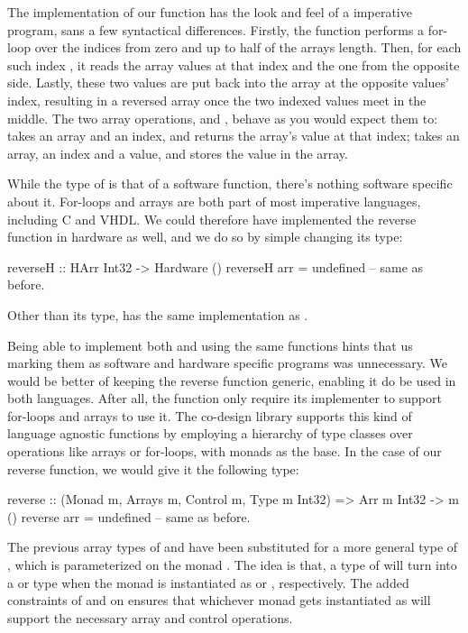 The implementation of our  function has the look and feel of a imperative program, sans a few syntactical differences. Firstly, the function performs a for-loop over the indices from zero and up to half of the arrays length. Then, for each such index , it reads the array values at that index and the one from the opposite side. Lastly, these two values are put back into the array at the opposite values' index, resulting in a reversed array once the two indexed values meet in the middle. The two array operations,  and , behave as you would expect them to:  takes an array and an index, and returns the array's value at that index;  takes an array, an index and a value, and stores the value in the array.

While the type of  is that of a software function, there's nothing software specific about it. For-loops and arrays are both part of most imperative languages, including C and VHDL. We could therefore have implemented the reverse function in hardware as well, and we do so by simple changing its type:

\begin{code}
reverseH :: HArr Int32 -> Hardware ()
reverseH arr = undefined -- same as before.
\end{code}

\noindent Other than its type,  has the same implementation as .

Being able to implement both  and  using the same functions hints that us marking them as software and hardware specific programs was unnecessary. We would be better of keeping the reverse function generic, enabling it do be used in both languages. After all, the function only require its implementer to support for-loops and arrays to use it. The co-design library supports this kind of language agnostic functions by employing a hierarchy of type classes over operations like arrays or for-loops, with monads as the base. In the case of our reverse function, we would give it the following type:

\begin{code}
reverse :: (Monad m, Arrays m, Control m, Type m Int32) => Arr m Int32 -> m ()
reverse arr = undefined -- same as before.
\end{code}

The previous array types of  and  have been substituted for a more general type of , which is parameterized on the monad . The idea is that, a type of  will turn into a  or  type when the monad is instantiated as  or , respectively. The added constraints of  and  on  ensures that whichever monad  gets instantiated as will support the necessary array and control operations.

